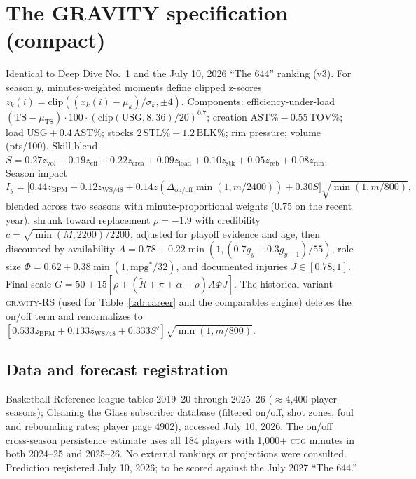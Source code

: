 \documentclass[11pt]{article}
\newcommand{\gravity}{\textsc{gravity}}
\newcommand{\ctg}{\textsc{ctg}}
\begin{document}
\appendix
\section{The GRAVITY specification (compact)}
\label{app:spec}

Identical to Deep Dive No.\ 1 and the July 10, 2026 ``The 644'' ranking (v3). For
season $y$, minutes-weighted moments define clipped z-scores
$z_k(i) = \mathrm{clip}((x_k(i)-\mu_k)/\sigma_k, \pm 4)$. Components: efficiency-under-load
$(\mathrm{TS}-\mu_{\mathrm{TS}})\cdot 100\cdot(\mathrm{clip}(\mathrm{USG},8,36)/20)^{0.7}$;
creation $\mathrm{AST\%}-0.55\,\mathrm{TOV\%}$; load $\mathrm{USG}+0.4\,\mathrm{AST\%}$;
stocks $2\,\mathrm{STL\%}+1.2\,\mathrm{BLK\%}$; rim pressure; volume (pts/100). Skill
blend $S = 0.27 z_{\text{vol}} + 0.19 z_{\text{eff}} + 0.22 z_{\text{crea}} + 0.09
z_{\text{load}} + 0.10 z_{\text{stk}} + 0.05 z_{\text{reb}} + 0.08 z_{\text{rim}}$.
Season impact
\begin{equation}
I_y = \bigl[0.44 z_{\mathrm{BPM}} + 0.12 z_{\mathrm{WS/48}}
+ 0.14 z(\Delta_{\text{on/off}} \min(1, m/2400)) + 0.30 S\bigr] \sqrt{\min(1, m/800)},
\label{eq:impact}
\end{equation}
blended across two seasons with minute-proportional weights ($0.75$ on the recent
year), shrunk toward replacement $\rho = -1.9$ with credibility
$c = \sqrt{\min(M, 2200)/2200}$, adjusted for playoff evidence and age, then discounted
by availability $A = 0.78 + 0.22\min(1, (0.7 g_y + 0.3 g_{y-1})/55)$, role size
$\Phi = 0.62 + 0.38 \min(1, \mathrm{mpg}^{*}/32)$, and documented injuries
$J \in [0.78, 1]$. Final scale $G = 50 + 15[\rho + (\tilde{R}+\pi+\alpha-\rho) A \Phi J]$.
The historical variant \gravity-RS (used for Table~\ref{tab:career} and the comparables
engine) deletes the on/off term and renormalizes to
$[0.533 z_{\mathrm{BPM}} + 0.133 z_{\mathrm{WS/48}} + 0.333 S']\sqrt{\min(1, m/800)}$.

\subsection*{Data and forecast registration}
Basketball-Reference league tables 2019--20 through 2025--26 ($\approx$4{,}400
player-seasons); Cleaning the Glass subscriber database (filtered on/off, shot zones,
foul and rebounding rates; player page 4902), accessed July 10, 2026. The on/off cross-season
persistence estimate uses all 184 players with 1{,}000+ \ctg{} minutes in both 2024--25
and 2025--26. No external rankings or projections were consulted. Prediction registered
July 10, 2026; to be scored against the July 2027 ``The 644.''
\end{document}
